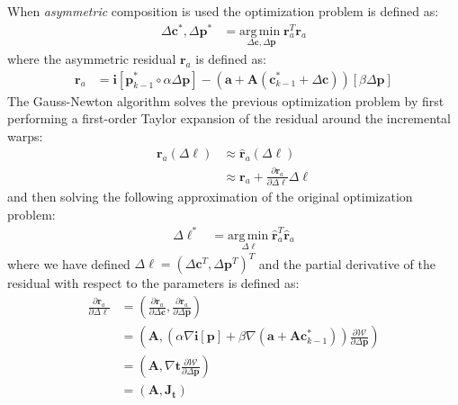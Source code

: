 When \emph{asymmetric} composition is used the optimization problem is defined as:
\begin{equation}
    \begin{aligned}
        \Delta \mathbf{c}^*, \Delta \mathbf{p}^* & = \underset{\Delta \mathbf{c}, \Delta \mathbf{p}}{\mathrm{arg\,min\;}} \mathbf{r}_a^T\mathbf{r}_a
    \label{eq:asymmetric_ssd}
    \end{aligned}
\end{equation}
where the asymmetric residual $\mathbf{r}_a$ is defined as: 
\begin{equation}
    \begin{aligned}
		\mathbf{r}_a & = \mathbf{i}[\mathbf{p}_{k-1}^* \circ \alpha \Delta \mathbf{p}] - (\mathbf{a} + \mathbf{A}(\mathbf{c}^*_{k-1} + \Delta\mathbf{c})) [\beta \Delta \mathbf{p}]
    \label{eq:asymmetric_residual}
    \end{aligned}
\end{equation}
The Gauss-Newton algorithm solves the previous optimization problem by first performing a first-order Taylor expansion of the residual around the incremental warps:
\begin{equation}
    \begin{aligned}
		\mathbf{r}_a(\Delta \boldsymbol{\ell}) & \approx \hat{\mathbf{r}}_a(\Delta \boldsymbol{\ell})
		\\
		& \approx \mathbf{r}_a + \frac{\partial \mathbf{r}_a}{\partial \Delta \boldsymbol{\ell}} \Delta \boldsymbol{\ell}
    \label{eq:asymmetric_residual_taylor}
    \end{aligned}
\end{equation}
and then solving the following approximation of the original optimization problem:
\begin{equation}
    \begin{aligned}
        \Delta \boldsymbol{\ell}^* & = \underset{\Delta \boldsymbol{\ell}}{\mathrm{arg\,min\;}} \hat{\mathbf{r}}_a^T\hat{\mathbf{r}}_a
    \label{eq:asymmetric_ssd_taylor}
    \end{aligned}
\end{equation}
where we have defined $\Delta \boldsymbol{\ell} = (\Delta \mathbf{c}^T, \Delta \mathbf{p}^T)^T$ and the partial derivative of the residual with respect to the parameters is defined as: 
\begin{equation}
    \begin{aligned}
		\frac{\partial \mathbf{r}_a}{\partial \Delta \boldsymbol{\ell}}& = \left( \frac{\partial \mathbf{r}_a}{\partial \Delta \mathbf{c}}, \frac{\partial \mathbf{r}_a}{\partial \Delta \mathbf{p}} \right)
		\\
		& = \left( \mathbf{A}, \left( \alpha \nabla \mathbf{i}[\mathbf{p}]  + \beta \nabla (\mathbf{a} + \mathbf{A}\mathbf{c}_{k-1}^*) \right) \frac{\partial \mathcal{W}}{\partial \Delta \mathbf{p}} \right)
		\\
		& = \left( \mathbf{A}, \nabla \mathbf{t} \frac{\partial \mathcal{W}}{\partial \Delta \mathbf{p}} \right)
		\\
		& = \left( \mathbf{A}, \mathbf{J}_\mathbf{t} \right)
    \label{eq:asymmetric_jacobian}
    \end{aligned}
\end{equation}
